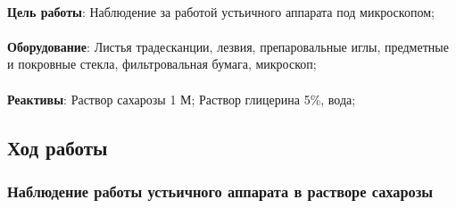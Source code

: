 


\begin{footnotesize}

\paragraph*{}\textbf{Цель работы}: Наблюдение за работой устьичного аппарата под микроскопом;

\paragraph*{}\textbf{Оборудование}: Листья традесканции, лезвия, препаровальные иглы, предметные и покровные стекла, фильтровальная бумага, микроскоп;

\paragraph*{}\textbf{Реактивы}: Раствор сахарозы 1 М; Раствор глицерина 5\%, вода;

\end{footnotesize}

\subsection*{Ход работы}

\subsubsection*{Наблюдение работы устьичного аппарата в растворе сахарозы}

